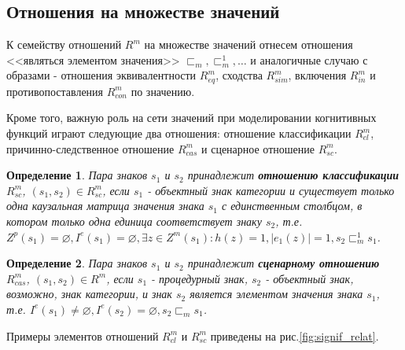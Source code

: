 \documentclass[12pt]{scrartcl}
\newtheorem{definition}{Определение}
\begin{document}
	\subsection{Отношения на множестве значений}	
	
	К семейству отношений $R^m$ на множестве значений отнесем отношения <<являться элементом значения>> ${\sqsubset_m,\sqsubset_m^1,\dots}$ и аналогичные случаю с образами - отношения эквивалентности $R_{eq}^m$, сходства $R_{sim}^m$, включения $R_{in}^m$ и противопоставления $R_{con}^m$ по значению.
	
	Кроме того, важную роль на сети значений при моделировании когнитивных функций играют следующие два отношения: отношение классификации $R_{cl}^m$, причинно-следственное отношение $R_{cas}^m$ и сценарное отношение $R_{sc}^m$.
	
	\begin{definition}
		Пара знаков $s_1$ и $s_2$ принадлежит \textbf{отношению классификации} $R_{sc}^m$, $(s_1,s_2)\in R_{sc}^m$, если $s_1$ - объектный знак категории и существует только одна каузальная матрица значения знака $s_1$ с единственным столбцом, в котором только одна единица соответствует знаку $s_2$, т.е. $Z^p(s_1)=\varnothing, I^e(s_1)=\varnothing, \exists z\in Z^m(s_1): h(z)=1, |e_1(z)|=1, s_2\sqsubset_m^1 s_1$.
	\end{definition}
	
	\begin{definition}
		Пара знаков $s_1$ и $s_2$ принадлежит \textbf{сценарному отношению} $R_{cas}^m$, $(s_1,s_2)\in R_{}^m$, если $s_1$ - процедурный знак, $s_2$ - объектный знак, возможно, знак категории, и знак $s_2$ является элементом значения знака $s_1$, т.е. $I^e(s_1)\not = \varnothing, I^e(s_2) = \varnothing, s_2\sqsubset_m s_1$.
	\end{definition}
	
	Примеры элементов отношений $R_{cl}^m$ и $R_{sc}^m$ приведены на рис.\ref{fig:signif_relat}.
	
\end{document}
